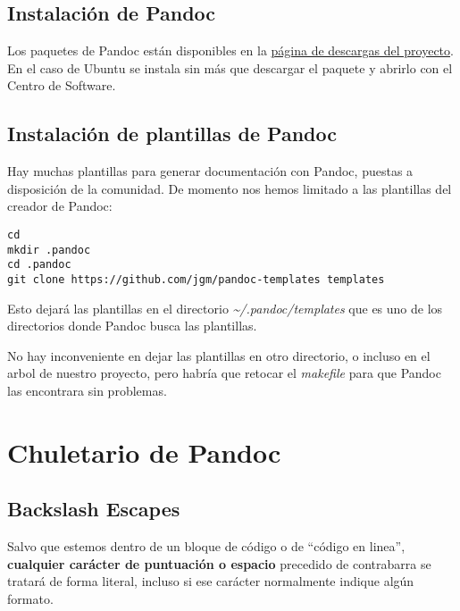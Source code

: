 \documentclass[12pt,spanish,]{article}
\begin{document}
\hypertarget{instalaciuxf3n-de-pandoc}{%
\subsection{Instalación de Pandoc}\label{instalaciuxf3n-de-pandoc}}

Los paquetes de Pandoc están disponibles en la
\href{http://pandoc.org/installing.html}{página de descargas del
proyecto}. En el caso de Ubuntu se instala sin más que descargar el
paquete y abrirlo con el Centro de Software.

\hypertarget{instalaciuxf3n-de-plantillas-de-pandoc}{%
\subsection{Instalación de plantillas de
Pandoc}\label{instalaciuxf3n-de-plantillas-de-pandoc}}

Hay muchas plantillas para generar documentación con Pandoc, puestas a
disposición de la comunidad. De momento nos hemos limitado a las
plantillas del creador de Pandoc:

\begin{verbatim}
cd 
mkdir .pandoc
cd .pandoc
git clone https://github.com/jgm/pandoc-templates templates
\end{verbatim}

Esto dejará las plantillas en el directorio
\emph{\textasciitilde{}/.pandoc/templates} que es uno de los directorios
donde Pandoc busca las plantillas.

No hay inconveniente en dejar las plantillas en otro directorio, o
incluso en el arbol de nuestro proyecto, pero habría que retocar el
\emph{makefile} para que Pandoc las encontrara sin problemas.

\hypertarget{chuletario-de-pandoc}{%
\section{Chuletario de Pandoc}\label{chuletario-de-pandoc}}

\hypertarget{backslash-escapes}{%
\subsection{Backslash Escapes}\label{backslash-escapes}}

Salvo que estemos dentro de un bloque de código o de ``código en
linea'', \textbf{cualquier carácter de puntuación o espacio} precedido
de contrabarra se tratará de forma literal, incluso si ese carácter
normalmente indique algún formato.
\end{document}
